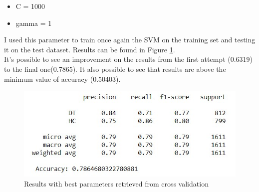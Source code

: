 \documentclass{article}
\begin{document}
\begin{itemize}
    \item C = 1000  
    \item gamma = 1
\end{itemize}

\noindet I used this parameter to train once again the SVM on the training set and testing it on the test dataset. Results can be found in Figure \ref{fig:best_results}.\\
It's possible to see an improvement on the results from the first attempt (0.6319) to the final one(0.7865). It also possible to see that results are above the minimum value of accuracy (0.50403).

\begin{figure}[ht]
  \includegraphics[width=\linewidth]{images/after_cv_results.jpg}
  \caption{Results with best parameters retrieved from cross validation}
  \label{fig:best_results}
\end{figure}
\end{document}
